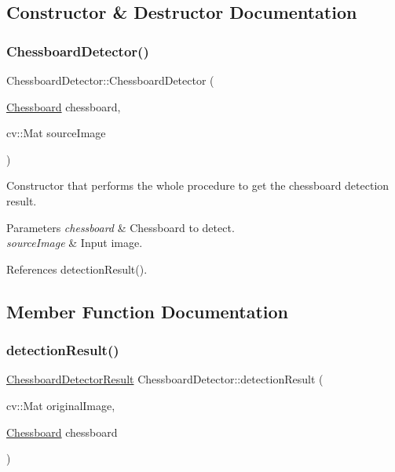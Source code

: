 \subsection{Constructor \& Destructor Documentation}
\mbox{\label{classChessboardDetector_aebbd98195c5f2b06ca0f10fb65d9211e}} 
\subsubsection{\texorpdfstring{Chessboard\+Detector()}{ChessboardDetector()}}
{\footnotesize\ttfamily Chessboard\+Detector\+::\+Chessboard\+Detector (\begin{DoxyParamCaption}\item[{\hyperlink{classChessboard}{Chessboard}}]{chessboard,  }\item[{cv\+::\+Mat}]{source\+Image }\end{DoxyParamCaption})}



Constructor that performs the whole procedure to get the chessboard detection result. 


\begin{DoxyParams}{Parameters}
{\em chessboard} & Chessboard to detect. \\
\hline
{\em source\+Image} & Input image. \\
\hline
\end{DoxyParams}


References detection\+Result().



\subsection{Member Function Documentation}
\mbox{\label{classChessboardDetector_a97550158d545864e639f0a6311f56f16}} 
\subsubsection{\texorpdfstring{detection\+Result()}{detectionResult()}}
{\footnotesize\ttfamily \hyperlink{structChessboardDetectorResult}{Chessboard\+Detector\+Result} Chessboard\+Detector\+::detection\+Result (\begin{DoxyParamCaption}\item[{cv\+::\+Mat}]{original\+Image,  }\item[{\hyperlink{classChessboard}{Chessboard}}]{chessboard }\end{DoxyParamCaption})}




